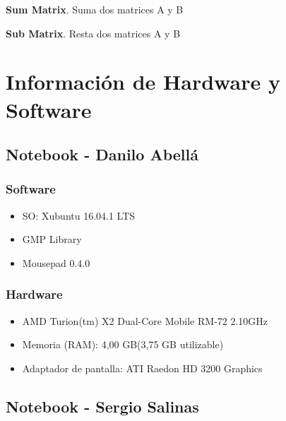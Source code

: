 \documentclass[12pt,letterpaper]{scrartcl}
\begin{document}
\begin{algorithm}[H]
  \caption{\textbf{Sum Matrix}. Suma dos matrices A y B}
\end{algorithm}

 \begin{algorithm}[H]
 
 \caption{\textbf{Sub Matrix}. Resta dos matrices A y B}
\end{algorithm}

\newpage



\section{Información de Hardware y Software}


\subsection{ Notebook - Danilo Abellá}
\subsubsection{Software}
\begin{itemize}
\item SO: Xubuntu 16.04.1 LTS
\item GMP Library
\item Mousepad 0.4.0
\end{itemize}

\subsubsection{Hardware}
\begin{itemize}
\item AMD Turion(tm) X2 Dual-Core Mobile RM-72 2.10GHz
\item Memoria (RAM): 4,00 GB(3,75 GB utilizable)
\item Adaptador de pantalla: ATI Raedon HD 3200 Graphics
\end{itemize}



\subsection{Notebook - Sergio Salinas}
\end{document}
